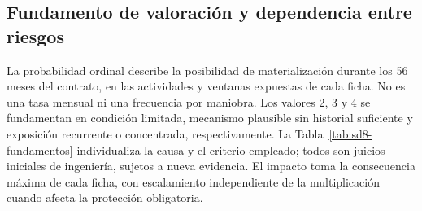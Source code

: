 \subsection{Fundamento de valoración y dependencia entre riesgos}
La probabilidad ordinal describe la posibilidad de materialización durante los 56 meses del contrato, en las actividades y ventanas expuestas de cada ficha. No es una tasa mensual ni una frecuencia por maniobra. Los valores 2, 3 y 4 se fundamentan en condición limitada, mecanismo plausible sin historial suficiente y exposición recurrente o concentrada, respectivamente. La Tabla~\ref{tab:sd8-fundamentos} individualiza la causa y el criterio empleado; todos son juicios iniciales de ingeniería, sujetos a nueva evidencia. El impacto toma la consecuencia máxima de cada ficha, con escalamiento independiente de la multiplicación cuando afecta la protección obligatoria.
\begingroup\setlength{\tabcolsep}{3pt}
